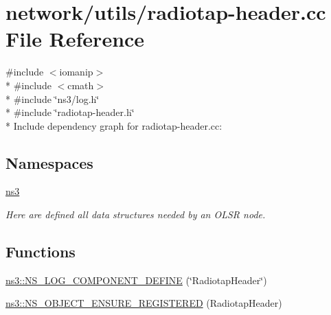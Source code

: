 \hypertarget{radiotap-header_8cc}{}\section{network/utils/radiotap-\/header.cc File Reference}
\label{radiotap-header_8cc}
{\ttfamily \#include $<$iomanip$>$}\\*
{\ttfamily \#include $<$cmath$>$}\\*
{\ttfamily \#include \char`\"{}ns3/log.\+h\char`\"{}}\\*
{\ttfamily \#include \char`\"{}radiotap-\/header.\+h\char`\"{}}\\*
Include dependency graph for radiotap-\/header.cc\+:
\subsection*{Namespaces}
\begin{DoxyCompactItemize}
\item 
 \hyperlink{namespacens3}{ns3}
\begin{DoxyCompactList}\small\item\em Here are defined all data structures needed by an O\+L\+SR node. \end{DoxyCompactList}\end{DoxyCompactItemize}
\subsection*{Functions}
\begin{DoxyCompactItemize}
\item 
\hyperlink{namespacens3_a436860667dba3079ff8cd0c9bb803611}{ns3\+::\+N\+S\+\_\+\+L\+O\+G\+\_\+\+C\+O\+M\+P\+O\+N\+E\+N\+T\+\_\+\+D\+E\+F\+I\+NE} (\char`\"{}Radiotap\+Header\char`\"{})
\item 
\hyperlink{namespacens3_a3d10c05588e1d98024da7568145f23bf}{ns3\+::\+N\+S\+\_\+\+O\+B\+J\+E\+C\+T\+\_\+\+E\+N\+S\+U\+R\+E\+\_\+\+R\+E\+G\+I\+S\+T\+E\+R\+ED} (Radiotap\+Header)
\end{DoxyCompactItemize}
